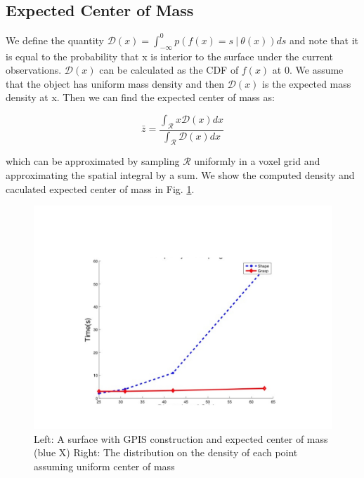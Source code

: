 \documentclass[letterpaper, 10 pt, conference]{ieeeconf}  %
\begin{document}
\subsection{Expected Center of Mass} 

We define the quantity $\mathcal{D}(x) = \int_{-\infty}^{0} p(f(x) =  s \ | \ \theta(x)) ds$ and note that it is equal to the probability that x is interior to the surface under the current observations.
$\mathcal{D}(x)$ can be calculated as the CDF of $f(x)$ at $0$.
We assume that the object has uniform mass density and then $\mathcal{D}(x)$ is the expected mass density at x.
Then we can find the expected center of mass as:

\begin{equation}
  \bar{z} 
  =
  \frac
    {\int_{\mathcal{R}}x \mathcal{D}(x) dx}
    {\int_{\mathcal{R}}  \mathcal{D}(x) dx}
\end{equation}

which can be approximated by sampling $\mathcal{R}$ uniformly in a voxel grid and approximating the spatial integral by a sum. We show the computed density and caculated expected center of mass in Fig. \ref{fig:GPIS_MASS}.


\begin{figure}[ht!]
\centering
\includegraphics[scale = 0.3]{figures/Slide06.jpg}
\caption{Left: A surface with GPIS construction and expected center of mass (blue X)
Right: The distribution on the density of each point assuming uniform center of mass}
\vspace*{-10pt}
\label{fig:GPIS_MASS}
\end{figure}
\end{document}
